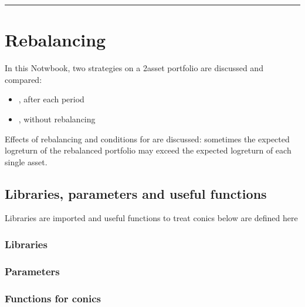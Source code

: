 \documentclass[letterpaper,10pt,english]{jupyterBook}
\begin{document}
\bigskip\hrule\bigskip


\sphinxstepscope


\chapter{Rebalancing}
\label{\detokenize{code/notebooks/rebalancing:rebalancing}}\label{\detokenize{code/notebooks/rebalancing::doc}}
\sphinxAtStartPar
In this Notwbook, two strategies on a 2\sphinxhyphen{}asset portfolio are discussed and compared:
\begin{itemize}
\item {} 
\sphinxAtStartPar
{}, after each period

\item {} 
\sphinxAtStartPar
{}, without rebalancing

\end{itemize}



\sphinxAtStartPar
Effects of rebalancing and conditions for  are discussed: sometimes the expected log\sphinxhyphen{}return of the rebalanced portfolio may exceed the expected log\sphinxhyphen{}return of each single asset.


\section{Libraries, parameters and useful functions}
\label{\detokenize{code/notebooks/rebalancing:libraries-parameters-and-useful-functions}}
\sphinxAtStartPar
Libraries are imported and useful functions to treat conics below are defined here


\subsection{Libraries}
\label{\detokenize{code/notebooks/rebalancing:libraries}}

\subsection{Parameters}
\label{\detokenize{code/notebooks/rebalancing:parameters}}

\subsection{Functions for conics}
\label{\detokenize{code/notebooks/rebalancing:functions-for-conics}}
\end{document}
